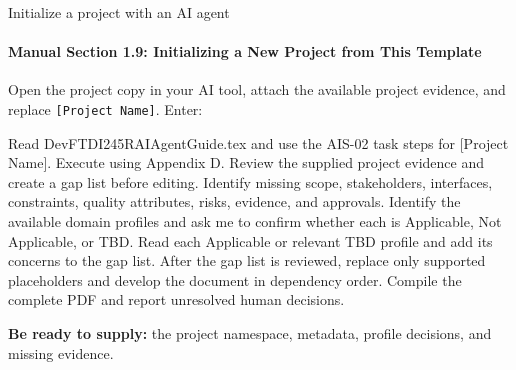 \begin{frame}{Initialize a project with an AI agent}
\framesubtitle{Manual Section 1.9: Initializing a New Project from This Template}
{\small Open the project copy in your AI tool, attach the available project evidence, and replace \mbox{\texttt{[Project Name]}}. Enter:\par}
\vspace{0.2cm}
\begingroup\small\ttfamily\raggedright
\noindent Read DevFTDI245RAIAgentGuide.tex and use the AIS-02 task steps for [Project Name]. Execute using Appendix D. Review the supplied project evidence and create a gap list before editing. Identify missing scope, stakeholders, interfaces, constraints, quality attributes, risks, evidence, and approvals. Identify the available domain profiles and ask me to confirm whether each is Applicable, Not Applicable, or TBD. Read each Applicable or relevant TBD profile and add its concerns to the gap list. After the gap list is reviewed, replace only supported placeholders and develop the document in dependency order. Compile the complete PDF and report unresolved human decisions.\par
\endgroup
\vspace{0.2cm}
{\small\textbf{Be ready to supply:} the project namespace, metadata, profile decisions, and missing evidence.}
\end{frame}
